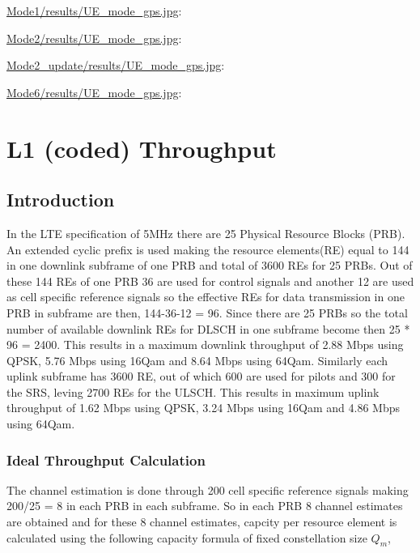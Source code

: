 \documentclass[a4paper,10pt]{article}
\newcommand{\printfile}[2][]{
 \begin{minipage}{8cm}
  \centering
  \url{#2}: #1

 \end{minipage}
}
\begin{document}
\printfile{Mode1/results/UE_mode_gps.jpg}
\printfile{Mode2/results/UE_mode_gps.jpg}

\printfile{Mode2_update/results/UE_mode_gps.jpg}
\printfile{Mode6/results/UE_mode_gps.jpg}

\section{L1 (coded) Throughput}


\subsection{Introduction}


In the LTE specification of 5MHz there are 25 Physical Resource Blocks (PRB). An extended cyclic prefix is used making the resource elements(RE) equal to 144 in one downlink subframe of one PRB and total of 3600 REs for 25 PRBs. Out of these 144 REs of one PRB 36 are used for control signals and another 12 are used as cell specific reference signals so the effective REs for data transmission in one PRB in subframe are then, 144-36-12 = 96. Since there are 25 PRBs so the total number of available downlink REs for DLSCH in one subframe become then 25 * 96 = 2400. This results in a maximum downlink throughput of 2.88 Mbps using QPSK, 5.76 Mbps using 16Qam and 8.64 Mbps using 64Qam. Similarly each uplink subframe has 3600 RE, out of which 600 are used for pilots and 300 for the SRS, leving 2700 REs for the ULSCH. This results in maximum uplink throughput of 1.62 Mbps using QPSK, 3.24 Mbps using 16Qam and 4.86 Mbps using 64Qam. 

\subsubsection{Ideal Throughput Calculation}
The channel estimation is done through 200 cell specific reference signals making 200/25 = 8 in each PRB in each subframe. So in each PRB 8 channel estimates are obtained and for these 8 channel estimates, capcity per resource element is calculated using the following capacity formula of fixed constellation size $Q_{m}$,

 
\end{document}
